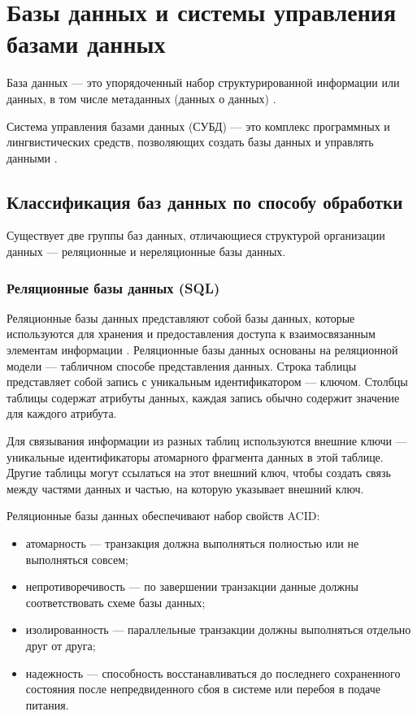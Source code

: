\section{Базы данных и системы управления базами данных}

База данных --- это упорядоченный набор структурированной информации или данных, в том числе метаданных (данных о данных) \cite{db}.

Система управления базами данных (СУБД) --- это комплекс программных и лингвистических средств, позволяющих создать базы данных и управлять данными \cite{dms}.

\subsection{Классификация баз данных по способу обработки}

Существует две группы баз данных, отличающиеся структурой организации данных --- реляционные и нереляционные базы данных.

\subsubsection{Реляционные базы данных (SQL)}

Реляционные базы данных представляют собой базы данных, которые используются для хранения и предоставления доступа к взаимосвязанным элементам информации \cite{sql}. Реляционные базы данных основаны на реляционной модели --- табличном способе представления данных. Строка таблицы представляет собой запись с уникальным идентификатором --- ключом. Столбцы таблицы содержат атрибуты данных, каждая запись обычно содержит значение для каждого атрибута. 

Для связывания информации из разных таблиц используются внешние ключи --- уникальные идентификаторы атомарного фрагмента данных в этой таблице. Другие таблицы могут ссылаться на этот внешний ключ, чтобы создать связь между частями данных и частью, на которую указывает внешний ключ.

Реляционные базы данных обеспечивают набор свойств ACID:

\begin{itemize}
	\item атомарность --- транзакция должна выполняться полностью или не выполняться совсем;
	\item непротиворечивость --- по завершении транзакции данные должны соответствовать схеме базы данных;
	\item изолированность --- параллельные транзакции должны выполняться отдельно друг от друга;
	\item надежность --- способность восстанавливаться до последнего сохраненного состояния после непредвиденного сбоя в системе или перебоя в подаче питания.
\end{itemize}

